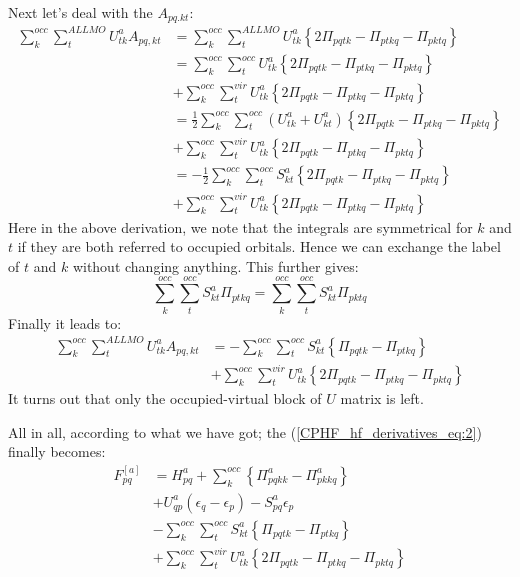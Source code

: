 Next let's deal with the $A_{pq.kt}$:
\begin{align}
  \label{CPHF_hf_derivatives_eq:5}
  \sum_{k}^{occ}\sum_{t}^{ALL MO}U^{a}_{tk}A_{pq,kt} &=
  \sum_{k}^{occ}\sum_{t}^{ALL MO}U^{a}_{tk}\left\{ 2\Pi_{pqtk} -
    \Pi_{ptkq} - \Pi_{pktq} \right\} \nonumber \\
  &= \sum_{k}^{occ}\sum_{t}^{occ}U^{a}_{tk}\left\{ 2\Pi_{pqtk} -
    \Pi_{ptkq} - \Pi_{pktq} \right\} \nonumber \\
  &+ \sum_{k}^{occ}\sum_{t}^{vir}U^{a}_{tk}\left\{ 2\Pi_{pqtk} -
    \Pi_{ptkq} - \Pi_{pktq} \right\} \nonumber \\
  &= \frac{1}{2}\sum_{k}^{occ}\sum_{t}^{occ}(U^{a}_{tk} +U^{a}_{kt})
  \left\{ 2\Pi_{pqtk} - \Pi_{ptkq} - \Pi_{pktq} \right\} \nonumber \\
  &+ \sum_{k}^{occ}\sum_{t}^{vir}U^{a}_{tk}\left\{ 2\Pi_{pqtk} -
    \Pi_{ptkq} - \Pi_{pktq} \right\} \nonumber \\
  &= -\frac{1}{2}\sum_{k}^{occ}\sum_{t}^{occ}S^{a}_{kt}
  \left\{ 2\Pi_{pqtk} - \Pi_{ptkq} - \Pi_{pktq} \right\} \nonumber \\
  &+ \sum_{k}^{occ}\sum_{t}^{vir}U^{a}_{tk}\left\{ 2\Pi_{pqtk} -
    \Pi_{ptkq} - \Pi_{pktq} \right\}
\end{align}
Here in the above derivation, we note that the integrals are
symmetrical for $k$ and $t$ if they are both referred to occupied
orbitals. Hence we can exchange the label of $t$ and $k$ without
changing anything. This further gives:
\begin{equation}
  \label{CPHF_hf_derivatives_eq:6}
  \sum_{k}^{occ}\sum_{t}^{occ}S^{a}_{kt}\Pi_{ptkq} =
  \sum_{k}^{occ}\sum_{t}^{occ}S^{a}_{kt}\Pi_{pktq} 
\end{equation}
Finally it leads to:
\begin{align}
  \label{CPHF_hf_derivatives_eq:7}
  \sum_{k}^{occ}\sum_{t}^{ALL MO}U^{a}_{tk}A_{pq,kt} &=
  -\sum_{k}^{occ}\sum_{t}^{occ}S^{a}_{kt}
  \left\{ \Pi_{pqtk} - \Pi_{ptkq} \right\} \nonumber \\
  &+ \sum_{k}^{occ}\sum_{t}^{vir}U^{a}_{tk}\left\{ 2\Pi_{pqtk} -
    \Pi_{ptkq} - \Pi_{pktq} \right\}
\end{align}
It turns out that only the occupied-virtual block of $U$ matrix is
left.

All in all, according to what we have got; the
(\ref{CPHF_hf_derivatives_eq:2}) finally becomes:
\begin{align}
  \label{CPHF_hf_derivatives_eq:8}
  F_{pq}^{[a]} &= H^{a}_{pq} + \sum_{k}^{occ}\left \{\Pi^{a}_{pqkk} -
    \Pi^{a}_{pkkq} \right\}
  \nonumber \\
  &+ U^{a}_{qp}\left(\epsilon_{q} - \epsilon_{p}\right) -
  S^{a}_{pq}\epsilon_{p} \nonumber \\
  &- \sum_{k}^{occ}\sum_{t}^{occ}S^{a}_{kt}
  \left\{ \Pi_{pqtk} - \Pi_{ptkq} \right\} \nonumber \\
  &+ \sum_{k}^{occ}\sum_{t}^{vir}U^{a}_{tk}\left\{ 2\Pi_{pqtk} -
    \Pi_{ptkq} - \Pi_{pktq} \right\}
\end{align}

